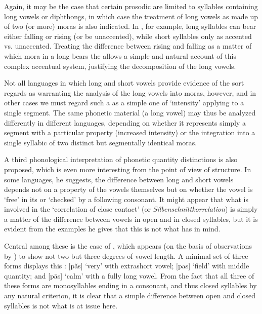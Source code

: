 Again, it may be the case that certain prosodic  are
limited to syllables containing long vowels or diphthongs, in which
case the treatment of long vowels as made up of two (or more) moras is
also indicated. In , for example, long syllables can bear
either falling or rising  (or be unaccented), while short
syllables only  as accented vs. unaccented. Treating the
difference between rising and falling  as a matter of which mora
in a long  bears the  allows a simple and natural
account of this complex accentual system, justifying the decomposition
of the long vowels.

Not all languages in which long and short vowels  provide
evidence of the sort {\Trubetzkoy} regards as warranting the analysis of
the long vowels into moras, however, and in other cases we must regard
such a  as a simple one of `intensity' applying to a single
segment. The same phonetic material (a long vowel) may thus be
analyzed differently in different languages, depending on whether it
represents simply a segment with a particular property (increased
intensity) or the integration into a single syllabic  of two
distinct but segmentally identical moras.

A third phonological interpretation of phonetic quantity distinctions
is also proposed, which is even more interesting from the point of
view of  structure. In some languages, he suggests, the
difference between long and short vowels depends not on a property of
the vowels themselves but on whether the vowel is `free' in its
 or `checked' by a following consonant. It might appear that
what is involved in the `correlation of close contact' (or
\emph{Silbenschnittkorrelation}) is simply a matter of the difference
between vowels in open and in closed syllables, but it is evident from
the examples he gives that this is not what {\Trubetzkoy} has in mind.

Central among these is the case of , which appears (on the basis
of observations by {\Whorf}) to show not two but three degrees of vowel
length. A minimal set of three forms displays this : [păs]
`very' with extrashort vowel; [pas] `field' with middle quantity; and
[pās] `calm' with a fully long vowel. From the fact that all three of
these forms are monosyllables ending in a consonant, and thus closed
syllables by any natural criterion, it is clear that a simple
difference between open and closed syllables is not what is at issue
here.

